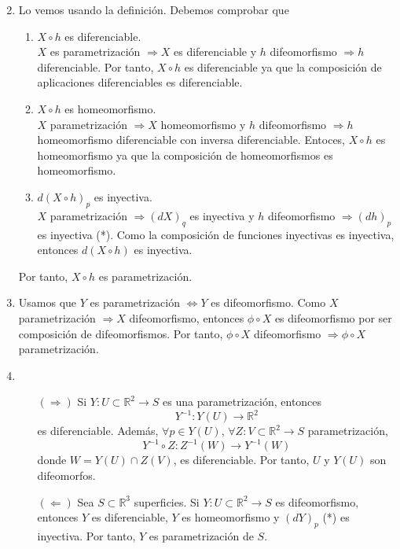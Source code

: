 \begin{sol}
  \begin{enumerate}
    \item [] 
    \item Lo vemos usando la definición. Debemos comprobar que 
      \begin{enumerate}
        \item $X \circ h$ es diferenciable. \\

          $X$ es parametrización $\Rightarrow X$ es diferenciable y $h$ difeomorfismo $\Rightarrow h$ diferenciable. Por tanto, $X \circ h$ es diferenciable ya que la composición de aplicaciones diferenciables es diferenciable.
        \item $X \circ h$ es homeomorfismo. \\

          $X$ parametrización $\Rightarrow X$ homeomorfismo y $h$ difeomorfismo $\Rightarrow h$ homeomorfismo diferenciable con inversa diferenciable. Entoces, $X \circ h$ es homeomorfismo ya que la composición de homeomorfismos es homeomorfismo.
        \item $ d(X \circ h)_{p}$ es inyectiva. \\

          $X$ parametrización $ \Rightarrow (d X)_{q}$ es inyectiva y $h$ difeomorfismo $\Rightarrow (d h)_{p}$ es inyectiva (*). Como la composición de funciones inyectivas es inyectiva, entonces $d(X \circ h)$ es inyectiva.


      \end{enumerate}
      Por tanto, $X \circ h$ es parametrización.
    \item Usamos que $Y$ es parametrización $\Leftrightarrow Y$ es difeomorfismo. Como $X$ parametrización $\Rightarrow X$ difeomorfismo, entonces $\phi \circ X$ es difeomorfismo por ser composición de difeomorfismos. Por tanto, $\phi \circ X$ difeomorfismo $\Rightarrow \phi \circ X$ parametrización.
    \item 
      \begin{enumerate}[label=(\roman*)]
        \item [$(\Rightarrow)$] Si $Y : U \subset \mathbb{R}^{2} \to S$ es una parametrización, entonces
          \[ 
            Y^{-1} : Y(U) \to \mathbb{R}^{2}
          \] 
          es diferenciable. Además, $\forall p \in Y(U)$, $\forall Z : V \subset \mathbb{R}^{2} \to S$ parametrización,
          \[ 
            Y^{-1} \circ Z : Z^{-1}(W) \to Y^{-1}(W)
          \] 
          donde $W = Y(U) \cap Z(V)$, es diferenciable. Por tanto, $U$ y $Y(U)$ son difeomorfos.
        \item [$(\Leftarrow)$] Sea $S \subset \mathbb{R}^{3}$ superficies. Si $Y : U \subset \mathbb{R}^{2} \to S$ es difeomorfismo, entonces $Y$ es diferenciable, $Y$ es homeomorfismo y $(d Y)_{p}$ (*) es inyectiva. Por tanto, $Y$ es parametrización de $S$. \\
      \end{enumerate}
  \end{enumerate}


\end{sol}
